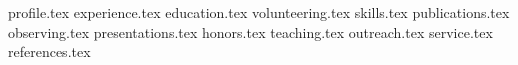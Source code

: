 \documentclass[11pt, a4paper]{awesome-cv}
\newcommand*{\sectiondir}{resume/}
\begin{document}
\makecvheader

{profile.tex}
{experience.tex}
\clearpage
{education.tex}
{volunteering.tex}
\clearpage
{skills.tex} 
{publications.tex}
\clearpage
{observing.tex}
{presentations.tex}
\clearpage
{honors.tex}
{teaching.tex}
{outreach.tex}
{service.tex}
{references.tex}
\end{document}
